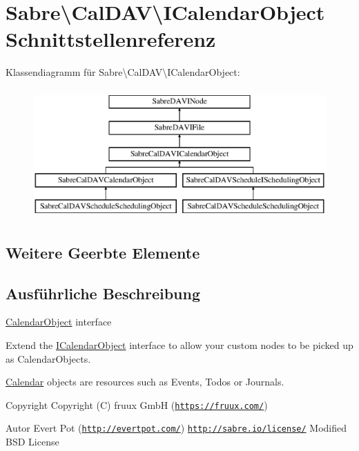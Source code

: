 \hypertarget{interface_sabre_1_1_cal_d_a_v_1_1_i_calendar_object}{}\section{Sabre\textbackslash{}Cal\+D\+AV\textbackslash{}I\+Calendar\+Object Schnittstellenreferenz}
\label{interface_sabre_1_1_cal_d_a_v_1_1_i_calendar_object}
Klassendiagramm für Sabre\textbackslash{}Cal\+D\+AV\textbackslash{}I\+Calendar\+Object\+:\begin{figure}[H]
\begin{center}
\leavevmode
\includegraphics[height=5.000000cm]{interface_sabre_1_1_cal_d_a_v_1_1_i_calendar_object}
\end{center}
\end{figure}
\subsection*{Weitere Geerbte Elemente}


\subsection{Ausführliche Beschreibung}
\mbox{\hyperlink{class_sabre_1_1_cal_d_a_v_1_1_calendar_object}{Calendar\+Object}} interface

Extend the \mbox{\hyperlink{interface_sabre_1_1_cal_d_a_v_1_1_i_calendar_object}{I\+Calendar\+Object}} interface to allow your custom nodes to be picked up as Calendar\+Objects.

\mbox{\hyperlink{class_sabre_1_1_cal_d_a_v_1_1_calendar}{Calendar}} objects are resources such as Events, Todo\textquotesingle{}s or Journals.

\begin{DoxyCopyright}{Copyright}
Copyright (C) fruux GmbH (\href{https://fruux.com/}{\tt https\+://fruux.\+com/}) 
\end{DoxyCopyright}
\begin{DoxyAuthor}{Autor}
Evert Pot (\href{http://evertpot.com/}{\tt http\+://evertpot.\+com/})  \href{http://sabre.io/license/}{\tt http\+://sabre.\+io/license/} Modified B\+SD License 
\end{DoxyAuthor}


